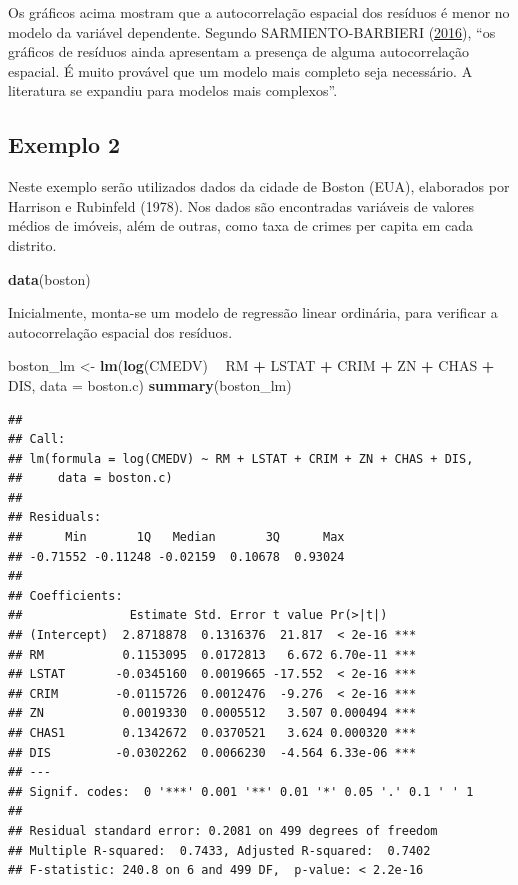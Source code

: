 \documentclass[12pt,]{article}
\newenvironment{Shaded}{\begin{snugshade}}{\end{snugshade}}
\newcommand{\KeywordTok}[1]{\textcolor[rgb]{0.13,0.29,0.53}{\textbf{#1}}}
\newcommand{\DataTypeTok}[1]{\textcolor[rgb]{0.13,0.29,0.53}{#1}}
\newcommand{\StringTok}[1]{\textcolor[rgb]{0.31,0.60,0.02}{#1}}
\newcommand{\OperatorTok}[1]{\textcolor[rgb]{0.81,0.36,0.00}{\textbf{#1}}}
\newcommand{\NormalTok}[1]{#1}
\begin{document}
Os gráficos acima mostram que a autocorrelação espacial dos resíduos é
menor no modelo da variável dependente. Segundo SARMIENTO-BARBIERI
(\protect\hyperlink{ref-sarmiento-barbieri}{2016}), ``os gráficos de
resíduos ainda apresentam a presença de alguma autocorrelação espacial.
É muito provável que um modelo mais completo seja necessário. A
literatura se expandiu para modelos mais complexos''.

\subsection{Exemplo 2}\label{exemplo-2}

Neste exemplo serão utilizados dados da cidade de Boston (EUA),
elaborados por Harrison e Rubinfeld (1978). Nos dados são encontradas
variáveis de valores médios de imóveis, além de outras, como taxa de
crimes per capita em cada distrito.

\begin{Shaded}
\begin{Highlighting}[]
\KeywordTok{data}\NormalTok{(boston)}
\end{Highlighting}
\end{Shaded}

Inicialmente, monta-se um modelo de regressão linear ordinária, para
verificar a autocorrelação espacial dos resíduos.

\begin{Shaded}
\begin{Highlighting}[]
\NormalTok{boston_lm <-}\StringTok{ }\KeywordTok{lm}\NormalTok{(}\KeywordTok{log}\NormalTok{(CMEDV) }\OperatorTok{~}\StringTok{ }\NormalTok{RM }\OperatorTok{+}\StringTok{ }\NormalTok{LSTAT }\OperatorTok{+}\StringTok{ }\NormalTok{CRIM }\OperatorTok{+}\StringTok{ }\NormalTok{ZN }\OperatorTok{+}\StringTok{ }\NormalTok{CHAS }\OperatorTok{+}\StringTok{ }\NormalTok{DIS, }
                \DataTypeTok{data =}\NormalTok{ boston.c)}
\KeywordTok{summary}\NormalTok{(boston_lm)}
\end{Highlighting}
\end{Shaded}

\begin{verbatim}
## 
## Call:
## lm(formula = log(CMEDV) ~ RM + LSTAT + CRIM + ZN + CHAS + DIS, 
##     data = boston.c)
## 
## Residuals:
##      Min       1Q   Median       3Q      Max 
## -0.71552 -0.11248 -0.02159  0.10678  0.93024 
## 
## Coefficients:
##               Estimate Std. Error t value Pr(>|t|)    
## (Intercept)  2.8718878  0.1316376  21.817  < 2e-16 ***
## RM           0.1153095  0.0172813   6.672 6.70e-11 ***
## LSTAT       -0.0345160  0.0019665 -17.552  < 2e-16 ***
## CRIM        -0.0115726  0.0012476  -9.276  < 2e-16 ***
## ZN           0.0019330  0.0005512   3.507 0.000494 ***
## CHAS1        0.1342672  0.0370521   3.624 0.000320 ***
## DIS         -0.0302262  0.0066230  -4.564 6.33e-06 ***
## ---
## Signif. codes:  0 '***' 0.001 '**' 0.01 '*' 0.05 '.' 0.1 ' ' 1
## 
## Residual standard error: 0.2081 on 499 degrees of freedom
## Multiple R-squared:  0.7433, Adjusted R-squared:  0.7402 
## F-statistic: 240.8 on 6 and 499 DF,  p-value: < 2.2e-16
\end{verbatim}
\end{document}
